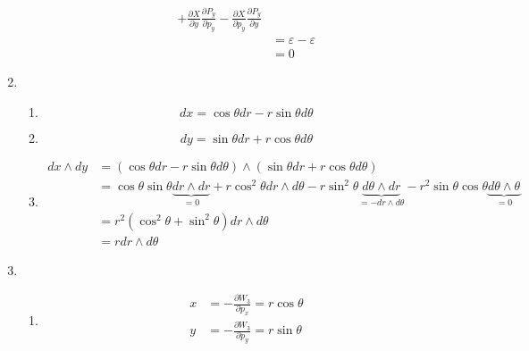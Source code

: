 \documentclass{jsarticle}
\begin{document}
\begin{enumerate}
\begin{enumerate}
$$\begin{aligned}
                    +\frac{\partial X}{\partial y}\frac{\partial P_y}{\partial p_y}
                    - \frac{\partial X}{\partial p_y}\frac{\partial P_y}{\partial y}              \\
                               & = \varepsilon - \varepsilon                                      \\
                               & =0
                  \end{aligned}
                $$
        \end{enumerate}
  \item
        \begin{enumerate}
          \item
                $$
                  dx = \cos \theta dr - r \sin \theta d \theta
                $$
          \item
                $$
                  dy = \sin \theta dr + r \cos \theta d \theta
                $$
          \item
                $$
                  \begin{aligned}
                    dx \wedge dy & = (\cos \theta dr - r \sin \theta d \theta)\wedge (\sin \theta dr + r \cos \theta d \theta) \\
                                 & = \cos \theta \sin \theta \underbrace{dr \wedge dr}_{=0}
                    + r \cos^2 \theta dr \wedge d\theta
                    - r \sin^2 \theta \underbrace{d\theta\wedge dr}_{=-dr \wedge d\theta}
                    - r^2 \sin \theta \cos \theta \underbrace{d \theta \wedge \theta}_{=0}                                     \\
                                 & = r^2 (\cos^2 \theta + \sin^2 \theta) dr \wedge d \theta                                    \\
                                 & = r dr \wedge d \theta
                  \end{aligned}
                $$
        \end{enumerate}
  \item
        \begin{enumerate}
          \item
                $$
                  \begin{aligned}
                    x        & = -\frac{\partial W_3}{\partial p_x} = r \cos \theta                             \\
                    y        & = -\frac{\partial W_3}{\partial p_y} = r \sin \theta                             \\

\end{aligned}$$
\end{enumerate}
\end{enumerate}
\end{document}
